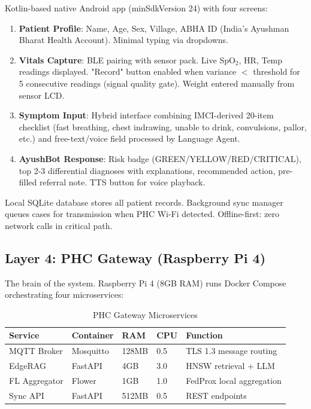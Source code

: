 \documentclass[conference,compsoc]{IEEEtran}
\begin{document}
Kotlin-based native Android app (minSdkVersion 24) with four screens:
\begin{enumerate}
    \item \textbf{Patient Profile}: Name, Age, Sex, Village, ABHA ID (India's Ayushman Bharat Health Account). Minimal typing via dropdowns.
    \item \textbf{Vitals Capture}: BLE pairing with sensor pack. Live SpO\(_2\), HR, Temp readings displayed. "Record" button enabled when variance \(<\) threshold for 5 consecutive readings (signal quality gate). Weight entered manually from sensor LCD.
    \item \textbf{Symptom Input}: Hybrid interface combining IMCI-derived 20-item checklist (fast breathing, chest indrawing, unable to drink, convulsions, pallor, etc.) and free-text/voice field processed by Language Agent.
    \item \textbf{AyushBot Response}: Risk badge (GREEN/YELLOW/RED/CRITICAL), top 2-3 differential diagnoses with explanations, recommended action, pre-filled referral note. TTS button for voice playback.
\end{enumerate}

Local SQLite database stores all patient records. Background sync manager queues cases for transmission when PHC Wi-Fi detected. Offline-first: zero network calls in critical path.

\subsection{Layer 4: PHC Gateway (Raspberry Pi 4)}

The brain of the system. Raspberry Pi 4 (8GB RAM) runs Docker Compose orchestrating four microservices:

\begin{table}[h]
\centering
\caption{PHC Gateway Microservices}
\label{tab:gateway_services}
\footnotesize
\begin{tabular}{@{}lllll@{}}
\toprule
\textbf{Service} & \textbf{Container} & \textbf{RAM} & \textbf{CPU} & \textbf{Function} \\ \midrule
MQTT Broker & Mosquitto & 128MB & 0.5 & TLS 1.3 message routing \\
EdgeRAG & FastAPI & 4GB & 3.0 & HNSW retrieval + LLM \\
FL Aggregator & Flower & 1GB & 1.0 & FedProx local aggregation \\
Sync API & FastAPI & 512MB & 0.5 & REST endpoints \\ \bottomrule
\end{tabular}
\end{table}
\end{document}
